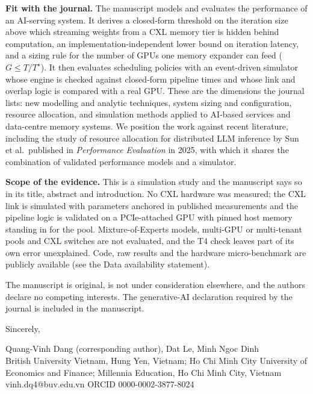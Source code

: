 \documentclass[11pt]{article}
\begin{document}
\textbf{Fit with the journal.} The manuscript models and evaluates the performance of an AI-serving system. It derives a closed-form threshold on the iteration size above which streaming weights from a CXL memory tier is hidden behind computation, an implementation-independent lower bound on iteration latency, and a sizing rule for the number of GPUs one memory expander can feed ($G\le T/T^\star$). It then evaluates scheduling policies with an event-driven simulator whose engine is checked against closed-form pipeline times and whose link and overlap logic is compared with a real GPU. These are the dimensions the journal lists: new modelling and analytic techniques, system sizing and configuration, resource allocation, and simulation methods applied to AI-based services and data-centre memory systems. We position the work against recent literature, including the study of resource allocation for distributed LLM inference by Sun et al.\ published in \emph{Performance Evaluation} in 2025, with which it shares the combination of validated performance models and a simulator.

\textbf{Scope of the evidence.} This is a simulation study and the manuscript says so in its title, abstract and introduction. No CXL hardware was measured; the CXL link is simulated with parameters anchored in published measurements and the pipeline logic is validated on a PCIe-attached GPU with pinned host memory standing in for the pool. Mixture-of-Experts models, multi-GPU or multi-tenant pools and CXL switches are not evaluated, and the T4 check leaves part of its own error unexplained. Code, raw results and the hardware micro-benchmark are publicly available (see the Data availability statement).

The manuscript is original, is not under consideration elsewhere, and the authors declare no competing interests. The generative-AI declaration required by the journal is included in the manuscript.

Sincerely,

Quang-Vinh Dang (corresponding author), Dat Le, Minh Ngoc Dinh\\
British University Vietnam, Hung Yen, Vietnam; Ho Chi Minh City University of Economics and Finance; Millennia Education, Ho Chi Minh City, Vietnam\\
vinh.dq4@buv.edu.vn \quad ORCID 0000-0002-3877-8024
\end{document}
